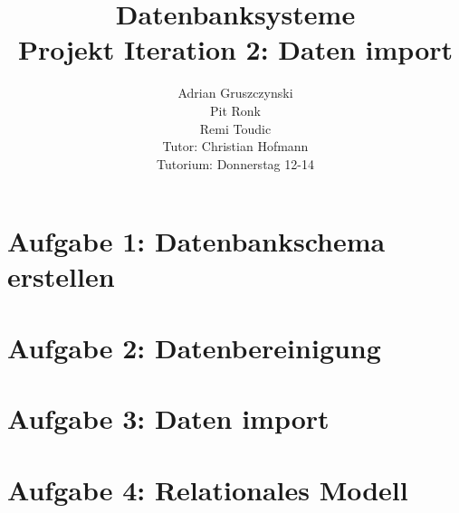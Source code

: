 \documentclass[12pt]{article}
\title{Datenbanksysteme\\
			 Projekt Iteration 2: Daten import}
\author{Adrian Gruszczynski\\ 
			Pit Ronk\\ %
			Remi Toudic\\ %
		Tutor: Christian Hofmann\\
		Tutorium: Donnerstag 12-14}
\begin{document}
\maketitle
\section*{Aufgabe 1: Datenbankschema erstellen}

\newpage
\section*{Aufgabe 2: Datenbereinigung}

\newpage
\section*{Aufgabe 3: Daten import}


\section*{Aufgabe 4: Relationales Modell}
\end{document}
